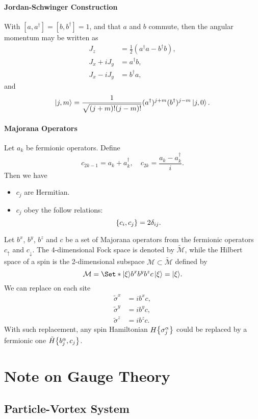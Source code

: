 \documentclass{article}
\begin{document}
\paragraph*{Jordan-Schwinger Construction}
With $[a,a^\dagger] = [b,b^\dagger] = 1$, and that $a$ and $b$ commute, then the angular momentum may be written as
\begin{align*}
    J_z &= \frac{1}{2}(a^\dagger a - b^\dagger b), \\
    J_x + i J_y &= a^\dagger b, \\
    J_x - i J_y &= b^\dagger a,
\end{align*}
and
\[ \ket{j,m} = \frac{1}{\sqrt{(j+m)! (j-m)!}}(a^\dagger)^{j+m} (b^\dagger)^{j-m}\ket{j,0}. \]

\paragraph*{Majorana Operators}
Let $a_k$ be fermionic operators.
Define
\[ c_{2k-1} = a_k + a_k^\dagger,\quad c_{2k} = \frac{a_k - a_k^\dagger}{i}. \]
Then we have
\begin{itemize}
    \item $c_j$ are Hermitian.
    \item $c_j$ obey the follow relations:
    \[ \qty{c_i,c_j} = 2\delta_{ij}. \]
\end{itemize}

Let $b^x$, $b^y$, $b^z$ and $c$ be a set of Majorana operators from the fermionic operators $c_\uparrow$ and $c_\downarrow$.
The 4-dimensional Fock space is denoted by $\tilde{\mathcal{M}}$, while the Hilbert space of a spin is the 2-dimensional subspace $\mathcal{M}\subset \tilde{\mathcal{M}}$ defined by
\[ \mathcal{M} = \Set*{\ket{\xi}}{b^x b^y b^z c\ket{\xi} = \ket{\xi}}. \]
We can replace on each site
\begin{align*}
    \tilde{\sigma}^x &= ib^x c, \\
    \tilde{\sigma}^y &= ib^y c, \\
    \tilde{\sigma}^z &= ib^z c.
\end{align*}
With such replacement, any spin Hamiltonian $H\qty{\sigma^\alpha_j}$ could be replaced by a fermionic one $\tilde{H}\qty{b^\alpha_j, c_j}$.

\section{Note on Gauge Theory}

\subsection{Particle-Vortex System}
\end{document}
